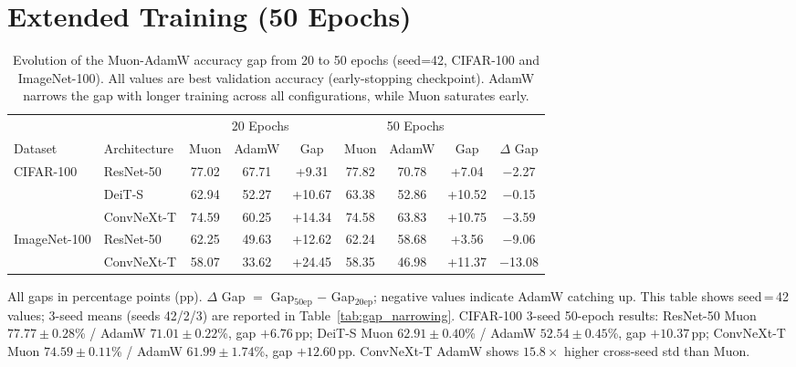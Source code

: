 \section{Extended Training (50 Epochs)}\label{sec:extended_training}

\begin{table}[h]
\centering
\caption{Evolution of the Muon-AdamW accuracy gap from 20 to 50 epochs (seed=42, CIFAR-100 and ImageNet-100). All values are best validation accuracy (early-stopping checkpoint). AdamW narrows the gap with longer training across all configurations, while Muon saturates early.}
\label{tab:gap_evolution}
\small
\begin{tabular}{llccccccc}
\toprule
 & & \multicolumn{3}{c}{20 Epochs} & \multicolumn{3}{c}{50 Epochs} & \\
\cmidrule(lr){3-5} \cmidrule(lr){6-8}
Dataset & Architecture & Muon & AdamW & Gap & Muon & AdamW & Gap & $\Delta$ Gap \\
\midrule
\multirow{3}{*}{CIFAR-100}
 & ResNet-50  & 77.02 & 67.71 & +9.31 & 77.82 & 70.78 & +7.04 & $-$2.27 \\
 & DeiT-S     & 62.94 & 52.27 & +10.67 & 63.38 & 52.86 & +10.52 & $-$0.15 \\
 & ConvNeXt-T & 74.59 & 60.25 & +14.34 & 74.58 & 63.83 & +10.75 & $-$3.59 \\
\midrule
\multirow{2}{*}{ImageNet-100}
 & ResNet-50  & 62.25 & 49.63 & +12.62 & 62.24 & 58.68 & +3.56 & $-$9.06 \\
 & ConvNeXt-T & 58.07 & 33.62 & +24.45 & 58.35 & 46.98 & +11.37 & $-$13.08 \\
\bottomrule
\end{tabular}
\vspace{0.3em}
\par\noindent\footnotesize{All gaps in percentage points (pp). $\Delta$ Gap $=$ Gap$_{50\text{ep}}$ $-$ Gap$_{20\text{ep}}$; negative values indicate AdamW catching up. This table shows seed\,=\,42 values; 3-seed means (seeds 42/2/3) are reported in Table~\ref{tab:gap_narrowing}. CIFAR-100 3-seed 50-epoch results: ResNet-50 Muon $77.77{\pm}0.28$\% / AdamW $71.01{\pm}0.22$\%, gap $+6.76$\,pp; DeiT-S Muon $62.91{\pm}0.40$\% / AdamW $52.54{\pm}0.45$\%, gap $+10.37$\,pp; ConvNeXt-T Muon $74.59{\pm}0.11$\% / AdamW $61.99{\pm}1.74$\%, gap $+12.60$\,pp. ConvNeXt-T AdamW shows $15.8\times$ higher cross-seed std than Muon.}
\end{table}

